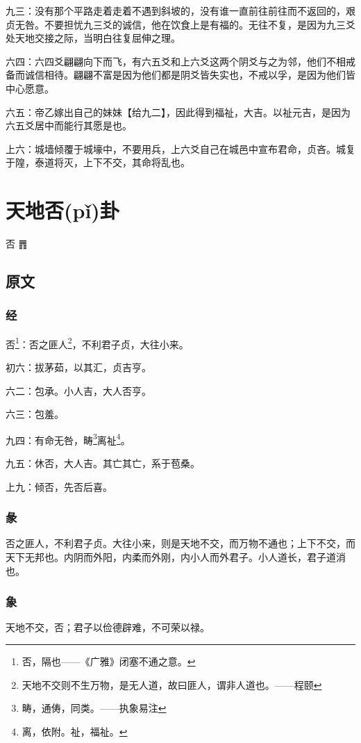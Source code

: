 \documentclass[12pt,oneside]{book}
\begin{document}
九三：没有那个平路走着走着不遇到斜坡的，没有谁一直前往前往而不返回的，艰贞无咎。不要担忧九三爻的诚信，他在饮食上是有福的。无往不复，是因为九三爻处天地交接之际，当明白往复屈伸之理。

六四：六四爻翩翩向下而飞，有六五爻和上六爻这两个阴爻与之为邻，他们不相戒备而诚信相待。翩翩不富是因为他们都是阴爻皆失实也，不戒以孚，是因为他们皆中心愿意。

六五：帝乙嫁出自己的妹妹【给九二】，因此得到福祉，大吉。以祉元吉，是因为六五爻居中而能行其愿是也。

上六：城墙倾覆于城壕中，不要用兵，上六爻自己在城邑中宣布君命，贞吝。城复于隍，泰道将灭，上下不交，其命将乱也。


\chapter{天地否(pǐ)卦}
否 {\Large ䷋}

\section{原文}

\subsection{经}
否\footnote{否，隔也——《广雅》闭塞不通之意。}：否之匪人\footnote{天地不交则不生万物，是无人道，故曰匪人，谓非人道也。——程颐}，不利君子贞，大往小来。

初六：拔茅茹，以其汇，贞吉亨。

六二：包承。小人吉，大人否亨。

六三：包羞。

九四：有命无咎，畴\footnote{畴，通俦，同类。——执象易注}离祉\footnote{离，依附。祉，福祉。}。

九五：休否，大人吉。其亡其亡，系于苞桑。

上九：倾否，先否后喜。

\subsection{彖}
否之匪人，不利君子贞。大往小来，则是天地不交，而万物不通也；上下不交，而天下无邦也。内阴而外阳，内柔而外刚，内小人而外君子。小人道长，君子道消也。

\subsection{象}
天地不交，否；君子以俭德辟难，不可荣以禄。
\end{document}
